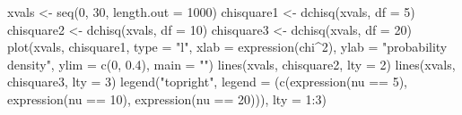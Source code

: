 \begin{Schunk}
\begin{Sinput}
 xvals <- seq(0, 30, length.out = 1000)
 chisquare1 <- dchisq(xvals, df = 5)
 chisquare2 <- dchisq(xvals, df = 10)
 chisquare3 <- dchisq(xvals, df = 20)
 plot(xvals, chisquare1, type = "l", xlab = expression(chi^2), ylab = "probability density", 
      ylim = c(0, 0.4), main = "")
 lines(xvals, chisquare2, lty = 2)
 lines(xvals, chisquare3, lty = 3)
 legend("topright", legend = (c(expression(nu == 5), expression(nu == 10), expression(nu == 
      20))), lty = 1:3)
\end{Sinput}
\end{Schunk}
